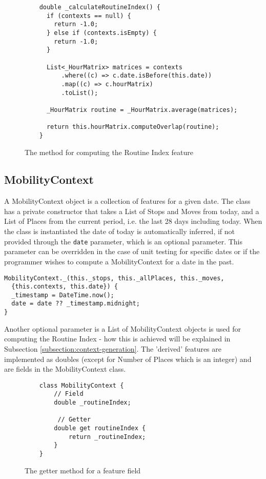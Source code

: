 \begin{figure}[h]
    \centering
    \begin{verbatim}
    double _calculateRoutineIndex() {
      if (contexts == null) {
        return -1.0;
      } else if (contexts.isEmpty) {
        return -1.0;
      }
    
      List<_HourMatrix> matrices = contexts
          .where((c) => c.date.isBefore(this.date))
          .map((c) => c.hourMatrix)
          .toList();
    
      _HourMatrix routine = _HourMatrix.average(matrices);
    
      return this.hourMatrix.computeOverlap(routine);
    }
    \end{verbatim}
    \caption{The method for computing the Routine Index feature}
    \label{fig:routine-index-code}
\end{figure}

\subsection{MobilityContext}
A MobilityContext object is a collection of features for a given date. The class has a private constructor that takes a List of Stops and Moves from today, and a List of Places from the current period, i.e. the last 28 days including today. When the class is instantiated the date of today is automatically inferred, if not provided through the \verb|date| parameter, which is an optional parameter. This parameter can be overridden in the case of unit testing for specific dates or if the programmer wishes to compute a MobilityContext for a date in the past.

\begin{verbatim}
MobilityContext._(this._stops, this._allPlaces, this._moves,
  {this.contexts, this.date}) {
  _timestamp = DateTime.now();
  date = date ?? _timestamp.midnight;
}
\end{verbatim}

Another optional parameter is a List of MobilityContext objects is used for computing the Routine Index - how this is achieved will be explained in Subsection \ref{subsection:context-generation}. The 'derived' features are implemented as doubles (except for Number of Places which is an integer) and are fields in the MobilityContext class.

\begin{figure}[h]
    \centering
    \begin{verbatim}
    class MobilityContext {
        // Field
        double _routineIndex;
     
         // Getter
        double get routineIndex {
            return _routineIndex;
        }
    }
    \end{verbatim}
    \caption{The getter method for a feature field}
    \label{fig:feature-getter}
\end{figure}

